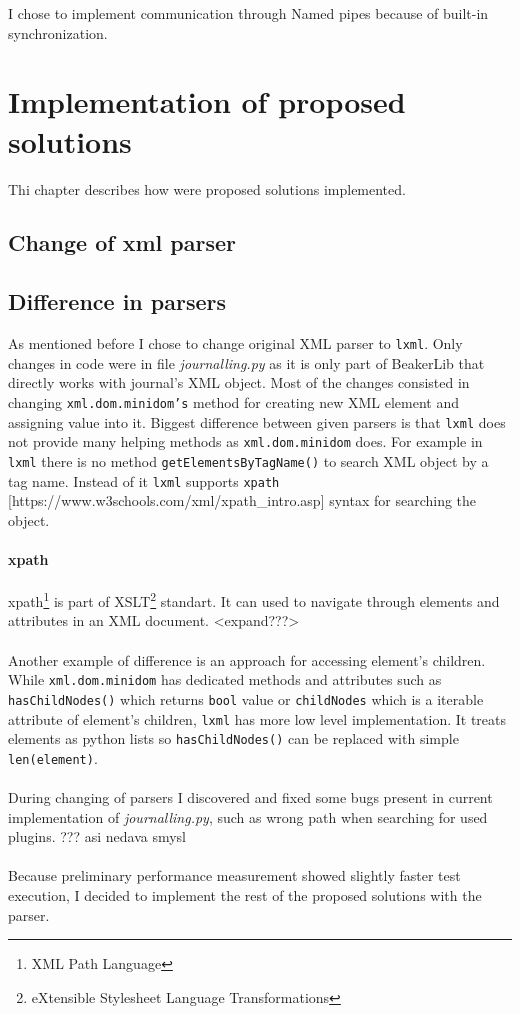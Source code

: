 I chose to implement communication through Named pipes because of built-in synchronization.


\chapter{Implementation of proposed solutions}
Thi chapter describes how were proposed solutions implemented.

\section{Change of xml parser}
\section{Difference in parsers}
As mentioned before I chose to change original XML parser to \texttt{lxml}. Only changes in code were in file \textit{journalling.py} as it is only part of BeakerLib that directly works with journal's XML object. 
Most of the changes consisted in changing \texttt{xml.dom.minidom's} method for creating new XML element and assigning value into it.
Biggest difference between given parsers is that \texttt{lxml} does not provide many helping methods as \texttt{xml.dom.minidom} does.
For example in \texttt{lxml}  there is no method \texttt{getElementsByTagName()} to search XML object by a tag name. Instead of it \texttt{lxml} supports \texttt{xpath} [https://www.w3schools.com/xml/xpath\_intro.asp] syntax for searching the object.

\subsubsection{xpath}
xpath\footnote{XML Path Language} is part of XSLT\footnote{eXtensible Stylesheet Language Transformations} standart. It can used to navigate through elements and attributes in an XML document. <expand???>
\\
\\
Another example of difference is an approach for accessing element's children. While \texttt{xml.dom.minidom} has dedicated methods and attributes such as \texttt{hasChildNodes()} which returns \texttt{bool} value or \texttt{childNodes} which is a iterable attribute of element's children, \texttt{lxml} has more low level implementation. It treats elements as python lists so \texttt{hasChildNodes()} can be replaced with simple \texttt{len(element)}.
\\
\\
During changing of parsers I discovered and fixed some bugs present in current implementation of \textit{journalling.py}, such as wrong path when searching for used plugins. ??? asi nedava smysl
\\
\\
Because preliminary performance measurement showed slightly faster test execution, I decided to implement the rest of the proposed solutions with the parser.

